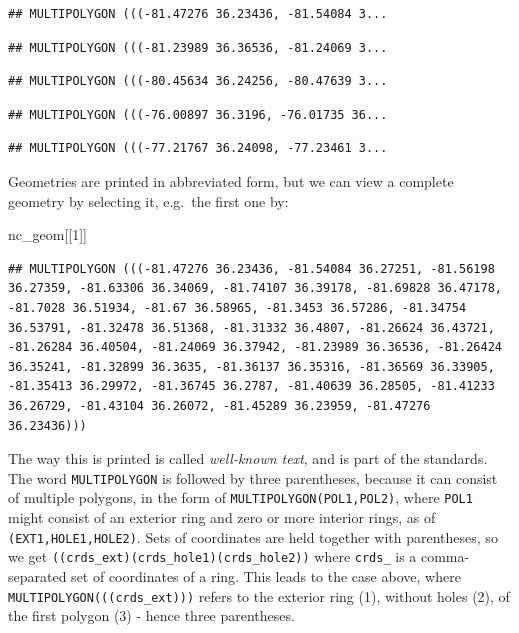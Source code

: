 \documentclass[
]{book}
\newenvironment{Shaded}{\begin{snugshade}}{\end{snugshade}}
\newcommand{\DecValTok}[1]{\textcolor[rgb]{0.00,0.00,0.81}{#1}}
\newcommand{\NormalTok}[1]{#1}
\begin{document}
\begin{verbatim}
## MULTIPOLYGON (((-81.47276 36.23436, -81.54084 3...
\end{verbatim}

\begin{verbatim}
## MULTIPOLYGON (((-81.23989 36.36536, -81.24069 3...
\end{verbatim}

\begin{verbatim}
## MULTIPOLYGON (((-80.45634 36.24256, -80.47639 3...
\end{verbatim}

\begin{verbatim}
## MULTIPOLYGON (((-76.00897 36.3196, -76.01735 36...
\end{verbatim}

\begin{verbatim}
## MULTIPOLYGON (((-77.21767 36.24098, -77.23461 3...
\end{verbatim}

Geometries are printed in abbreviated form, but we can view a complete geometry by selecting it, e.g.~the first one by:

\begin{Shaded}
\begin{Highlighting}[]
\NormalTok{nc\_geom[[}\DecValTok{1}\NormalTok{]]}
\end{Highlighting}
\end{Shaded}

\begin{verbatim}
## MULTIPOLYGON (((-81.47276 36.23436, -81.54084 36.27251, -81.56198 36.27359, -81.63306 36.34069, -81.74107 36.39178, -81.69828 36.47178, -81.7028 36.51934, -81.67 36.58965, -81.3453 36.57286, -81.34754 36.53791, -81.32478 36.51368, -81.31332 36.4807, -81.26624 36.43721, -81.26284 36.40504, -81.24069 36.37942, -81.23989 36.36536, -81.26424 36.35241, -81.32899 36.3635, -81.36137 36.35316, -81.36569 36.33905, -81.35413 36.29972, -81.36745 36.2787, -81.40639 36.28505, -81.41233 36.26729, -81.43104 36.26072, -81.45289 36.23959, -81.47276 36.23436)))
\end{verbatim}

The way this is printed is called \emph{well-known text}, and is part of the standards. The word \texttt{MULTIPOLYGON} is followed by three parentheses, because it can consist of multiple polygons, in the form of \texttt{MULTIPOLYGON(POL1,POL2)}, where \texttt{POL1} might consist of an exterior ring and zero or more interior rings, as of \texttt{(EXT1,HOLE1,HOLE2)}. Sets of coordinates are held together with parentheses, so we get \texttt{((crds\_ext)(crds\_hole1)(crds\_hole2))} where \texttt{crds\_} is a comma-separated set of coordinates of a ring. This leads to the case above, where \texttt{MULTIPOLYGON(((crds\_ext)))} refers to the exterior ring (1), without holes (2), of the first polygon (3) - hence three parentheses.
\end{document}
